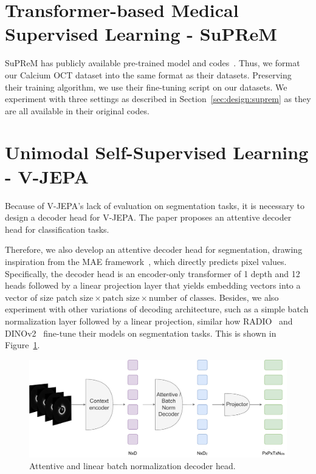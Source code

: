 \documentclass[a4paper,11pt,oneside]{report}
\begin{document}
\section{Transformer-based Medical Supervised Learning - SuPReM}
SuPReM has publicly available pre-trained model and codes~\cite{Li2024}. Thus, we format our Calcium OCT dataset into the same format as their datasets. Preserving their training algorithm, we use their fine-tuning script on our datasets. We experiment with three settings as described in Section~\ref{sec:design:suprem} as they are all available in their original codes.

\section{Unimodal Self-Supervised Learning - V-JEPA}\label{sec:implementation:vjepa}
Because of V-JEPA's lack of evaluation on segmentation tasks, it is necessary to design a decoder head for V-JEPA. The paper proposes an attentive decoder head for classification tasks. 

Therefore, we also develop an attentive decoder head for segmentation, drawing inspiration from the MAE framework~\cite{He2022}, which directly predicts pixel values. Specifically, the decoder head is an encoder-only transformer of 1 depth and 12 heads followed by a linear projection layer that yields embedding vectors into a vector of size \(\text{patch size} \times \text{patch size} \times \text{number of classes}\). Besides, we also experiment with other variations of decoding architecture, such as a simple batch normalization layer followed by a linear projection, similar how RADIO~\cite{Ranzinger2024RADIO} and DINOv2~\cite{Oquab2024dinov} fine-tune their models on segmentation tasks. This is shown in Figure~\ref{fig:vjepa-attentive-and-batchnorm-decoder-head}. 

\begin{figure}[ht]
    \centering
    \includegraphics[width=0.6\linewidth]{figures/fig_implementation_vjepa_attentive_and_batchnorm_decoder.pdf}
    \caption{Attentive and linear batch normalization decoder head.}
    \label{fig:vjepa-attentive-and-batchnorm-decoder-head}
\end{figure}%
\end{document}
